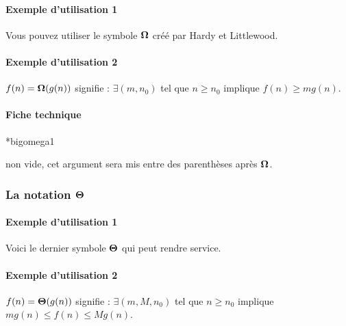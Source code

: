 \documentclass[12pt,a4paper]{article}
\makeatletter
\theoremstyle{definition}
\newcommand\IDmacro{\@ifstar{\@IDmacro@star}{\@IDmacro@no@star}}
\newcommand\@IDmacro@no@star[3]{%
    \texttt{%
    	\textbackslash#1%
    	\IfStrEq{#2}{0}{}{%
    		\,\,[#2 Option%
				\IfStrEq{#2}{1}{}{s}]%
			}%
	    \IfStrEq{#3}{}{}{%
	    		\,\,(#3 Argument%
				\IfStrEq{#3}{1}{}{s})%
			}
	   	}
    \immediate\write\tempfile{macro,#1,#2,#3}%
}
\newcommand\@IDmacro@star[2]{%
    \@IDmacro@no@star{#1}{0}{#2}%
}
\newcommand\@IDoptarg{\@ifstar{\@IDoptarg@star}{\@IDoptarg@no@star}}
\newcommand\@IDoptarg@star[2]{%
	\vspace{0.5em}
	\textbf{---} \texttt{#1%
		\IfStrEq{#2}{}{:}{\,#2:}%
	}%
}
\newcommand\@IDoptarg@no@star[2]{%
	\IfStrEq{#2}{}{%
		\@IDoptarg@star{#1}{}%
	}{%
		\@IDoptarg@star{#1}{#2}%
	}%
}
\newcommand\IDarg[1]{%
	\@IDoptarg{Argument}{#1}%
}
\makeatother
\begin{document}
            \paragraph{Exemple d'utilisation 1}

\begin{tcblisting}{}
Vous pouvez utiliser le symbole $\bigomega{}$ créé par Hardy et Littlewood.
\end{tcblisting}


            \paragraph{Exemple d'utilisation 2}

\begin{tcblisting}{}
$f(n) = \bigomega{g(n)}$ signifie :
$\exists (m, n_0)$ tel que $n \geqslant n_0$ implique $f(n) \geqslant m g(n)$.
\end{tcblisting}


            \paragraph{Fiche technique}

\IDmacro*{bigomega}{1}

\IDarg{} non vide, cet argument sera mis entre des parenthèses après $\bigomega{}$.



        \subsubsection{\texorpdfstring{La notation $\bigtheta{}$}%
                               {La notation "grand Theta"}}

            \paragraph{Exemple d'utilisation 1}

\begin{tcblisting}{}
Voici le dernier symbole $\bigtheta{}$ qui peut rendre service.
\end{tcblisting}


            \paragraph{Exemple d'utilisation 2}

\begin{tcblisting}{}
$f(n) = \bigtheta{g(n)}$ signifie : $\exists (m, M, n_0)$ tel que $n \geqslant n_0$
implique $m g(n) \leqslant f(n) \leqslant M g(n)$.
\end{tcblisting}
\end{document}
